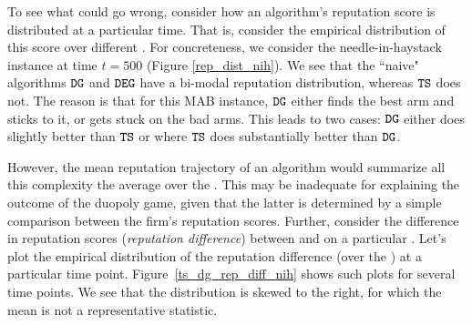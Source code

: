 \documentclass[../competing_bandits.tex]{subfiles}
\begin{document}
{To see what could go wrong, consider how an algorithm's reputation score is distributed at a particular time. That is, consider the empirical distribution of this score over different \MRVs. For concreteness, we consider the needle-in-haystack instance at time $t=500$ (Figure \ref{rep_dist_nih}).
We see that the ``naive" algorithms $\mathtt{DG}$ and $\mathtt{DEG}$ have a bi-modal reputation distribution, whereas $\mathtt{TS}$ does not. The reason is that for this MAB instance, $\mathtt{DG}$ either finds the best arm and sticks to it, or gets stuck on the bad arms. This leads to two cases: $\mathtt{DG}$ either does slightly better than $\mathtt{TS}$ or where $\mathtt{TS}$ does substantially better than $\mathtt{DG}$.

However, the mean reputation trajectory of an algorithm would summarize all this complexity the average over the \MRVs. This may be inadequate for explaining the outcome of the duopoly game, given that the latter is determined by a simple comparison between the firm's reputation scores. Further, consider the difference in reputation scores (\emph{reputation difference}) between \TS and \DG on a particular \MRV. Let's plot the empirical distribution of the reputation difference (over the \MRVs) at a particular time point. Figure~\ref{ts_dg_rep_diff_nih} shows such plots for several time points. We see that the distribution is skewed to the right, for which the mean is not a representative statistic.  





}
\end{document}
